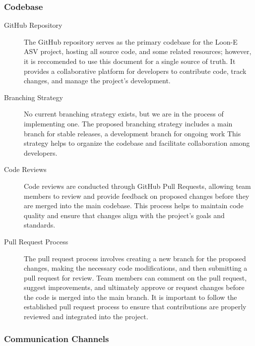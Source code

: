 \subsubsection{Codebase}

\begin{description}
    \item[GitHub Repository] 
        The GitHub repository serves as the primary codebase for the Loon-E ASV project, hosting all source code, and some related resources; however, it is reccomended to use this document for a single source of truth.
        It provides a collaborative platform for developers to contribute code, track changes, and manage the project's development.

    \item[Branching Strategy] 
        No current branching strategy exists, but we are in the process of implementing one. 
        The proposed branching strategy includes a main branch for stable releases, a development branch for ongoing work
        This strategy helps to organize the codebase and facilitate collaboration among developers.

    \item[Code Reviews] 
        Code reviews are conducted through GitHub Pull Requests, allowing team members to review and provide feedback on proposed changes before they are merged into the main codebase. 
        This process helps to maintain code quality and ensure that changes align with the project's goals and standards.

    \item[Pull Request Process] 
        The pull request process involves creating a new branch for the proposed changes, making the necessary code modifications, and then submitting a pull request for review. 
        Team members can comment on the pull request, suggest improvements, and ultimately approve or request changes before the code is merged into the main branch.
        It is important to follow the established pull request process to ensure that contributions are properly reviewed and integrated into the project.
\end{description}

\subsubsection{Communication Channels}

